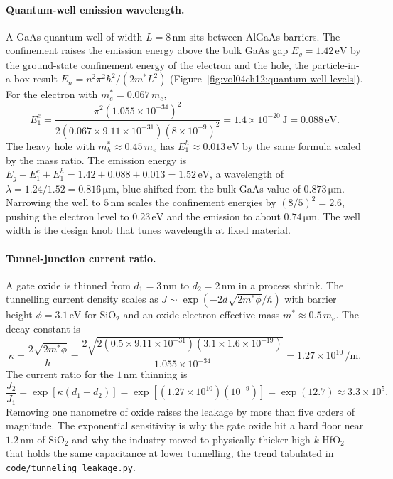 \paragraph{Quantum-well emission wavelength.}
A GaAs quantum well of width $L = 8\,\si{\nano\meter}$ sits between
AlGaAs barriers. The confinement raises the emission energy above the
bulk GaAs gap $E_{g} = 1.42\,\si{\electronvolt}$ by the ground-state
confinement energy of the electron and the hole, the particle-in-a-box
result $E_{n} = n^{2}\pi^{2}\hbar^{2}/(2m^{*}L^{2})$
(Figure~\ref{fig:vol04ch12:quantum-well-levels}). For the electron with
$m^{*}_{e} = 0.067\,m_{e}$,
\[
E_{1}^{e} = \frac{\pi^{2}(1.055\times 10^{-34})^{2}}{2(0.067 \times
9.11\times 10^{-31})(8\times 10^{-9})^{2}}
= 1.4\times 10^{-20}\,\si{\joule} = 0.088\,\si{\electronvolt}.
\]
The heavy hole with $m^{*}_{h} \approx 0.45\,m_{e}$ has $E_{1}^{h}
\approx 0.013\,\si{\electronvolt}$ by the same formula scaled by the
mass ratio. The emission energy is $E_{g} + E_{1}^{e} + E_{1}^{h} =
1.42 + 0.088 + 0.013 = 1.52\,\si{\electronvolt}$, a wavelength of
$\lambda = 1.24/1.52 = 0.816\,\si{\micro\meter}$, blue-shifted from the
bulk GaAs value of $0.873\,\si{\micro\meter}$. Narrowing the well to
$5\,\si{\nano\meter}$ scales the confinement energies by $(8/5)^{2} =
2.6$, pushing the electron level to $0.23\,\si{\electronvolt}$ and the
emission to about $0.74\,\si{\micro\meter}$. The well width is the
design knob that tunes wavelength at fixed material.



\paragraph{Tunnel-junction current ratio.}
A gate oxide is thinned from $d_{1} = 3\,\si{\nano\meter}$ to $d_{2} =
2\,\si{\nano\meter}$ in a process shrink. The tunnelling current
density scales as $J \sim \exp(-2d\sqrt{2m^{*}\phi}/\hbar)$ with barrier
height $\phi = 3.1\,\si{\electronvolt}$ for SiO$_{2}$ and an oxide
electron effective mass $m^{*} \approx 0.5\,m_{e}$. The decay constant
is
\[
\kappa = \frac{2\sqrt{2m^{*}\phi}}{\hbar}
= \frac{2\sqrt{2(0.5\times 9.11\times 10^{-31})(3.1\times 1.6\times
10^{-19})}}{1.055\times 10^{-34}}
= 1.27\times 10^{10}\,\si{\per\meter}.
\]
The current ratio for the $1\,\si{\nano\meter}$ thinning is
\[
\frac{J_{2}}{J_{1}} = \exp[\kappa(d_{1}-d_{2})]
= \exp[(1.27\times 10^{10})(10^{-9})] = \exp(12.7) \approx 3.3\times 10^{5}.
\]
Removing one nanometre of oxide raises the leakage by more than five
orders of magnitude. The exponential sensitivity is why the gate oxide
hit a hard floor near $1.2\,\si{\nano\meter}$ of SiO$_{2}$ and why the
industry moved to physically thicker high-$k$ HfO$_{2}$ that holds the
same capacitance at lower tunnelling, the trend tabulated in
\texttt{code/tunneling\_leakage.py}.

